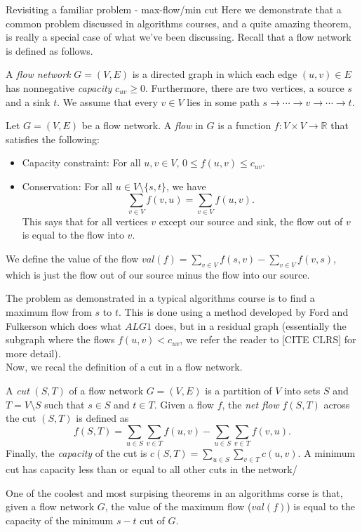 \documentclass[11pt]{article}
\newcommand{\R}{\mathbb{R}}
\renewcommand{\'}{^{'}}
\newenvironment{definition}[2][Definition]{\begin{trivlist}
\item[\hskip \labelsep {\bfseries #1}\hskip \labelsep {\bfseries #2.}]}{\end{trivlist}}
\begin{document}
\begin{section}{Revisiting a familiar problem - max-flow/min cut}
	Here we demonstrate that a common problem discussed in algorithms courses, and a quite 
	amazing theorem, is really a special case of what we've been discussing. Recall that a 
	flow network is defined as follows.
	\begin{definition}{(Flow network)}
		A \emph{flow network} $G = (V,E)$ is a directed graph in which each edge $(u,v)\in E$ 
		has nonnegative \emph{capacity} $c_{uv} \geq 0$. Furthermore, there are two 
		vertices, a source $s$ and a sink $t$. We assume that every $v\in V$ lies in 
		some path $s\to \cdots \to v\to \cdots \to t$.
	\end{definition}
	\begin{definition}{(Flow)}
		Let $G = (V,E)$ be a flow network. A \emph{flow} in $G$ is a function $f: V\times V \to 
		\R$ that satisfies the following:
		\begin{itemize}
			\item Capacity constraint: For all $u,v\in V$, $0\leq f(u,v) \leq 
				c_{uv}$.
			\item Conservation: For all $u\in V\setminus \{s,t\}$, we have 
				\[
					\sum _{v\in V} f(v,u) = \sum_{v\in V} f(u,v).
				\]
				This says that for all vertices $v$ except our source and sink, the 
				flow out of $v$ is equal to the flow into $v$. 
		\end{itemize}
		We define the value of the flow $val(f) = \sum_{v\in V} f(s,v) - \sum_{v\in V} f(v,s)$, 
		which is just the flow out of our source minus the flow into our source.
	\end{definition}
	The problem as demonstrated in a typical algorithms course is to find a maximum flow from $s$ 
	to $t$. This is done using a method developed by Ford and Fulkerson which does what $ALG 1$ 
	does, but in a residual graph (essentially the subgraph where the flows $f(u,v) < c_{uv}$, we 
	refer the reader to [CITE CLRS] for more detail). \\
	Now, we recal the definition of a cut in a flow network.
	\begin{definition}{(Cut)}
		A \emph{cut} $(S,T)$ of a flow network $G=(V,E)$ is a partition of $V$ into sets $S$ 
		and $T = V\setminus S$ such that $s\in S$ and $t\in T$. Given a flow $f$, the 
		\emph{net flow} $f(S,T)$ across the cut $(S,T)$ is defined as 
		\[
			f(S,T) = \sum_{u\in S} \sum_{v\in T} f(u,v) - \sum_{u\in S} \sum_{v\in T} 
			f(v,u).
		\]
		Finally, the \emph{capacity} of the cut is $c(S,T) = 
		\sum_{u\in S} \sum_{v\in T} c(u,v)$. A minimum cut has capacity less than or equal to 
		all other cuts in the network/
	\end{definition}
	One of the coolest and most surpising theorems in an algorithms corse is that, given a flow 
	network $G$, the value of the maximum flow ($val(f)$) is equal to the capacity of the minimum 
	$s-t$ cut of $G$.
\end{section}
\end{document}
